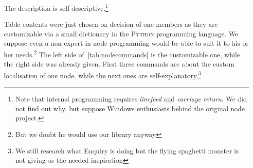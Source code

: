 The description is self-descriptive.\footnote{Note that internal programming requires \textit{linefeed} and \textit{carriage return}. We did not find out 
why, but suppose Windows enthusiasts behind the original node project.}

Table contents were just chosen on decision of one members as they are customizable via a small dictionary in the \textsc{Python} programming language. We 
suppose even a non-expert in node programming would be able to suit it to his or her needs.\footnote{But we doubt he would use our library anyway}
The left side of~\ref{tab:nodecommands} is the customizable one, while the right side was already given. First three commands are about the 
custom localisation of one node, while the next ones are self-explanatory.\footnote{We still research what Enquiry is doing but the flying spaghetti monster is not giving us the needed inspiration}
